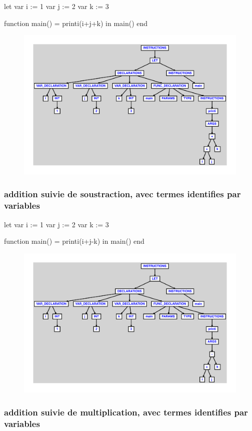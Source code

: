 \documentclass{article}
\begin{document}
\begin{verbatimtab}
let
	var i := 1
	var j := 2
	var k := 3

	function main() = printi(i+j+k)
in main() end
\end{verbatimtab}
\begin{figure}[H]\centering\includegraphics[max width=\textwidth]{ast/ast_55.pdf}\end{figure}\subsubsection{addition suivie de soustraction, avec termes identifies par variables}
\begin{verbatimtab}
let
	var i := 1
	var j := 2
	var k := 3

	function main() = printi(i+j-k)
in main() end
\end{verbatimtab}
\begin{figure}[H]\centering\includegraphics[max width=\textwidth]{ast/ast_56.pdf}\end{figure}\subsubsection{addition suivie de multiplication, avec termes identifies par variables}
\end{document}
